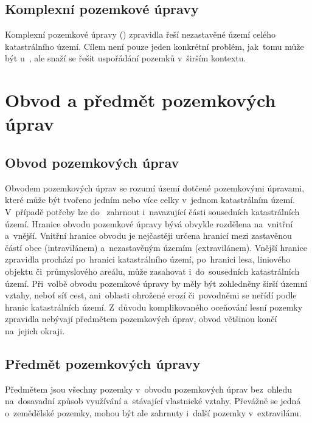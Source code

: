 \subsection{Komplexní pozemkové úpravy}
\label{komplexní_pu}

Komplexní pozemkové úpravy () zpravidla řeší nezastavěné
území celého kata\-strálního území. Cílem  není pouze jeden
konkrétní problém, jak~tomu může být u~, ale snaží se
řešit uspořádání pozemků v~širším kontextu.

\section{Obvod a předmět pozemkových úprav}
\label{obvod_a_predmet_pu}

\subsection{Obvod pozemkových úprav}
\label{obvod_pu}

Obvodem pozemkových úprav se rozumí území dotčené pozemkovými
úpra\-vami, které může být tvořeno jedním nebo více celky v~jednom
katastrálním území. V~pří\-padě potřeby lze do~ zahrnout
i~navazující části sousedních katastrálních území. Hranice obvodu
pozemkové úpravy bývá obvykle rozdělena na~vnitřní a~vnější. Vnitřní
hranice obvodu je nejčastěji určena hranicí mezi zastavěnou částí obce
(intravilánem) a~nezastavěným územím (extravilánem). Vnější hranice
zpravidla pro\-chází po~hranici katastrálního území, po~hranici lesa,
liniového objektu či~průmy\-slového areálu, může zasahovat
i~do~sousedních katastrálních území. Při~volbě obvodu pozemkové úpravy
by měly být zohledněny širší územní vztahy, neboť síť cest,
ani~oblasti ohrožené erozí či~povodněmi se neřídí podle hranic
katastrálních území. Z~důvodu komplikovaného oceňování 
lesní pozemky zpravidla nebývají předmětem pozemkových úprav, obvod
většinou končí na~jejich okraji.

\subsection{Předmět pozemkových úpravy}
\label{predmet_pu}

Předmětem  jsou všechny pozemky v~obvodu pozemkových úprav
bez~ohledu na~dosavadní způsob využívání a~stávající vlastnické
vztahy. Převážně se jedná o~zemědělské pozemky, mohou být ale zahrnuty
i~další pozemky v~extravilánu.

